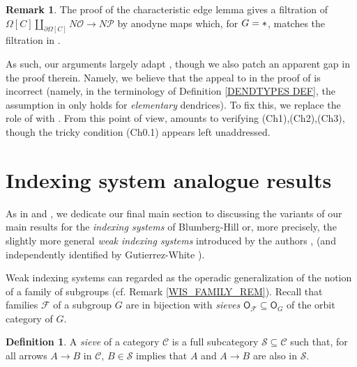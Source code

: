 \documentclass[a4paper,10pt
,draft
]{article}%
\numberwithin{equation}{section}
\numberwithin{figure}{section}
\theoremstyle{definition} %
\newtheorem{definition}[equation]{Definition}%
\newtheorem{remark}[equation]{Remark}%
\newcommand{\F}{\ensuremath{\mathcal F}}
\newcommand{\1}{\ensuremath{\mathbbm 1}}%
\begin{document}
\begin{remark}\label{CHAREDCOMP REM}
	The proof of the characteristic edge lemma
	\cite[Lemma 3.4]{BP_edss}
	gives a filtration of 
	$\Omega[C] \amalg_{\partial \Omega[C]} N \mathcal{O}
	\to N \mathcal{P}$ by anodyne maps
	which, for $G=\**$,
	matches the filtration in \cite[\S 3]{CM13b}.

	As such, our arguments largely adapt \cite{CM13b},
	though we also patch an apparent gap in the proof therein.
	Namely, we believe that the appeal to  
	\cite[Lemma 3.4]{CM13b} in the proof of
	\cite[Lemma 3.5]{CM13b} is incorrect
	(namely, in the terminology
	of Definition \ref{DENDTYPES DEF},
	the assumption in \cite[Lemma 3.4]{CM13b}
	only holds for \emph{elementary} dendrices).
	To fix this, we replace the role of 
	\cite[Lemma 3.4]{CM13b} with 
	\cite[Lemma 3.4]{BP_edss}.
	From this point of view, \cite[Lemma 3.5]{CM13b}
	amounts to verifying (Ch1),(Ch2),(Ch3),
	though the tricky condition (Ch0.1)
	appears left unaddressed.
\end{remark}





\section{Indexing system analogue results}\label{INDSYS SEC}


As in \cite[\S 6]{BP_edss} and \cite[\S 9]{Per18}, 
we dedicate our final main section to 
discussing the variants of our main results 
for the \textit{indexing systems} of Blumberg-Hill \cite{BH15}
or, more precisely,
the slightly more general \textit{weak indexing systems}
introduced by the authors \cite[\S 9]{Per18}, \cite[\S 4.4]{BP_geo} (and independently identified by Gutierrez-White \cite{GW18}).

Weak indexing systems can regarded as
the operadic generalization of the notion of a family of subgroups 
(cf. Remark \ref{WIS_FAMILY_REM}).
Recall that families $\F$ of a subgroup $G$ are in
bijection with \textit{sieves} 
$\mathsf{O}_\F \subseteq \mathsf{O}_G$ of the orbit category of $G$.


\begin{definition}
      A \textit{sieve} of a category $\mathcal C$ is a full subcategory $\mathcal S \subseteq \mathcal C$ such that,
      for all arrows $A \to B$ in $\mathcal C$, 
      $B \in \mathcal S$ implies that $A$ and $A \to B$ are also in $\mathcal S$.
\end{definition}
\end{document}
